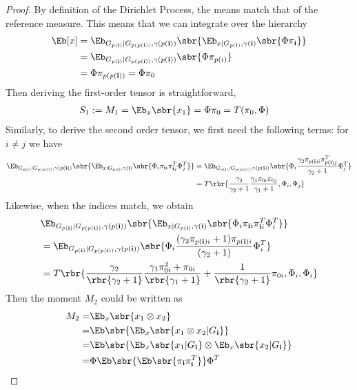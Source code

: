 \documentclass[twoside,11pt]{article}
\newcommand{\ib}{{\bf i}}
\begin{document}
{\begin{proof}
  By definition of the Dirichlet Process, the means match
  that of the reference measure. This means that we can integrate over
  the hierarchy
  \begin{align}
\Eb[x] &= \Eb_{G_{p(\ib)} | G_{p(p(\ib))}, \gamma(p(\ib))}  \sbr{\Eb_{x|G_{p(\ib)}, \gamma(\ib)}\sbr{\Phi \pi_{\ib}}} \\
         &= \Eb_{G_{p(\ib)} |G_{p(p(\ib))}, \gamma(p(\ib))} \sbr{\Phi \pi_{p(i)}}\\
         &= \Phi \pi_{p(p(\ib))} = \Phi \pi_0 
\end{align}
Then deriving the first-order tensor is straightforward, 
  \begin{align}
     S_1 &:= M_1 = \Eb_x \sbr{x_1} = \Phi \pi_0  = T(\pi_0, \Phi)
  \end{align}
Similarly, to derive the second order tensor, we first need the
following terms: for $i \neq j$ we have
\begin{align}
\Eb_{G_{p(\ib)} | G_{p(p(\ib))}, \gamma(p(\ib))}  \sbr{\Eb_{x|G_{p(\ib)}, \gamma(\ib)}\sbr{\Phi_i \pi_{\ib i} \pi_{\ib j}^T \Phi_j^T}} &= \Eb_{G_{p(\ib)} | G_{p(p(\ib))}, \gamma(p(\ib))}   \sbr{\Phi_i\frac{\gamma_2 \pi_{p(\ib) i} \pi_{p(\ib) j}^T }{\gamma_2 + 1} \Phi_j^T}\\
&= T\rbr{\frac{\gamma_2}{\gamma_2 + 1}\frac{\gamma_1 \pi_{0i}
  \pi_{0j}}{\gamma_1 + 1}, \Phi_i, \Phi_j}
  \end{align}
  Likewise, when the indices match, we obtain
  \begin{align}
&\Eb_{G_{p(\ib)} | G_{p(p(\ib))}, \gamma(p(\ib))}  \sbr{\Eb_{x|G_{p(\ib)}, \gamma(\ib)}\sbr{\Phi_i \pi_{\ib i} \pi_{\ib i}^T  \Phi_i^T }} \\
&= \Eb_{G_{p(\ib)} | G_{p(p(\ib))}, \gamma(p(\ib))}  \sbr{\Phi_i\frac{(\gamma_2  \pi_{p(\ib) i}+ 1)  \pi_{p(\ib) i}}{(\gamma_2 + 1)} \Phi_i^T}\\
&=  T\rbr{\frac{\gamma_2}{\rbr{\gamma_2+1}} \frac{ \gamma_1 \pi_{0i}^2
    + \pi_{0i}}{\rbr{\gamma_1 +1}} +\frac{1}{\rbr{\gamma_2 + 1}}
  \pi_{0i}, \Phi_i, \Phi_i}
\end{align}
Then the moment $M_2$ could be written as
    \begin{align}
     M_2 =& \Eb_x \sbr{x_1\otimes x_2} \\
     =& \Eb\sbr{\Eb_x\sbr{x_1 \otimes x_2 | G_{\ib}}}  \\
            =& \Eb \sbr{\Eb_x \sbr{x_1| G_{\ib}} \otimes  \Eb_x \sbr{x_2| G_{\ib}} } \\
           =&  \Phi \Eb \sbr{ \Eb \sbr{\pi_{\ib}\pi_{\ib}^T}}\Phi ^T \\

\end{align}
\end{proof}}
\end{document}
